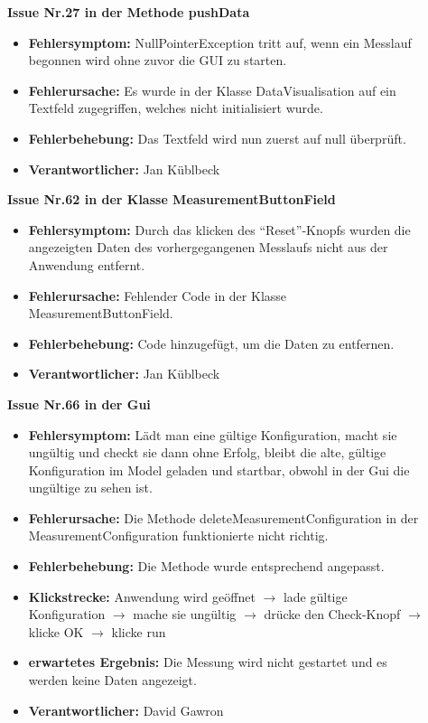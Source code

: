 \documentclass[parskip=full]{scrartcl}
\begin{document}
\begin{description}

\item []\textbf{Issue Nr.27 in der Methode pushData} 

\begin{itemize}
\item []\textbf{Fehlersymptom:} NullPointerException tritt auf, wenn ein Messlauf begonnen wird ohne zuvor die GUI zu starten.
\item []\textbf{Fehlerursache:} Es wurde in der Klasse DataVisualisation auf ein Textfeld zugegriffen, welches nicht initialisiert wurde.
\item []\textbf{Fehlerbehebung:} Das Textfeld wird nun zuerst auf null überprüft.
\item []\textbf{Verantwortlicher:} Jan Küblbeck
\end{itemize}

\item []\textbf{Issue Nr.62 in der Klasse MeasurementButtonField} 

\begin{itemize}
\item []\textbf{Fehlersymptom:} Durch das klicken des ``Reset''-Knopfs wurden die angezeigten Daten des vorhergegangenen Messlaufs nicht aus der Anwendung entfernt.
\item []\textbf{Fehlerursache:} Fehlender Code in der Klasse MeasurementButtonField.
\item []\textbf{Fehlerbehebung:} Code hinzugefügt, um die Daten zu entfernen.
\item []\textbf{Verantwortlicher:} Jan Küblbeck
\end{itemize}



\item []\textbf{Issue Nr.66 in der Gui} 

\begin{itemize}
\item []\textbf{Fehlersymptom:} Lädt man eine gültige Konfiguration, macht sie ungültig und checkt sie dann ohne Erfolg, bleibt die alte, gültige Konfiguration im Model geladen und startbar, obwohl in der Gui die ungültige zu sehen ist.
\item []\textbf{Fehlerursache:} Die Methode deleteMeasurementConfiguration in der MeasurementConfiguration funktionierte nicht richtig.
\item []\textbf{Fehlerbehebung:} Die Methode wurde entsprechend angepasst.
\item []\textbf{Klickstrecke:} Anwendung wird geöffnet $\rightarrow$ lade gültige Konfiguration $\rightarrow$ mache sie ungültig $\rightarrow$ drücke den Check-Knopf $\rightarrow$ klicke OK $\rightarrow$ klicke run
\item []\textbf{erwartetes Ergebnis:} Die Messung wird nicht gestartet und es werden keine Daten angezeigt.
\item []\textbf{Verantwortlicher:} David Gawron
\end{itemize}

\end{description}
\end{document}

